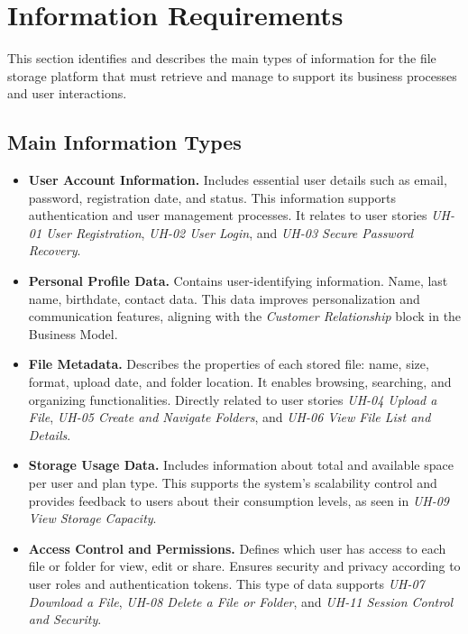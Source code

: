 \section{Information Requirements}

This section identifies and describes the main types of information for the file storage platform that must retrieve and manage to support its business processes and user interactions.

\subsection{Main Information Types}

\begin{itemize}
    \item \textbf{User Account Information.} 
    Includes essential user details such as email, password, registration date, and status. This information supports authentication and user management processes. 
    It relates to user stories \textit{UH-01 User Registration}, \textit{UH-02 User Login}, and \textit{UH-03 Secure Password Recovery}.

    \item \textbf{Personal Profile Data.} 
    Contains user-identifying information. Name, last name, birthdate, contact data. 
    This data improves personalization and communication features, aligning with the \textit{Customer Relationship} block in the Business Model.

    \item \textbf{File Metadata.} 
    Describes the properties of each stored file: name, size, format, upload date, and folder location. 
    It enables browsing, searching, and organizing functionalities. 
    Directly related to user stories \textit{UH-04 Upload a File}, \textit{UH-05 Create and Navigate Folders}, and \textit{UH-06 View File List and Details}.

    \item \textbf{Storage Usage Data.} 
    Includes information about total and available space per user and plan type. 
    This supports the system’s scalability control and provides feedback to users about their consumption levels, as seen in \textit{UH-09 View Storage Capacity}.

    \item \textbf{Access Control and Permissions.} 
    Defines which user has access to each file or folder for view, edit or share. 
    Ensures security and privacy according to user roles and authentication tokens. 
    This type of data supports \textit{UH-07 Download a File}, \textit{UH-08 Delete a File or Folder}, and \textit{UH-11 Session Control and Security}.


\end{itemize}
